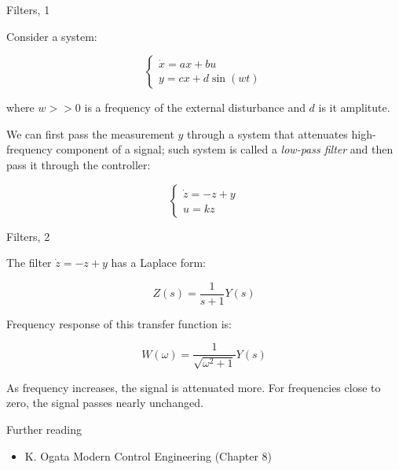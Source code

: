 \documentclass{beamer}
\begin{document}
\begin{frame}{Filters, 1}
	\begin{flushleft}
		
		Consider a system:
		
		\begin{equation}
			\begin{cases}
				\dot{ x }  = 
				ax+bu
				\\
				y = c x + d \sin(wt)
			\end{cases}
		\end{equation}
		
		where $w >>0$ is a frequency of the external disturbance and $d$ is it amplitute.
		
		\bigskip
		
		We can first pass the measurement $y$ through a system that attenuates high-frequency component of a signal; such system is called a \emph{low-pass filter} and then pass it through the controller:
		
		\begin{equation}
			\begin{cases}
				\dot{ z }  = 
				-z+y
				\\
				u = k z
			\end{cases}
		\end{equation}
		 
		
	\end{flushleft}
\end{frame}




\begin{frame}{Filters, 2}
	\begin{flushleft}
		
		The filter $\dot{ z }  = 
		-z+y$ has a Laplace form:
		
		\begin{equation}
			Z(s) = \frac{1}{s+1} Y(s)
		\end{equation}
		
		Frequency response of this transfer function is:
		
		\begin{equation}
			W(\omega) = \frac{1}{\sqrt{\omega^2 + 1}} Y(s)
		\end{equation}
		
		As frequency increases, the signal is attenuated more. For frequencies close to zero, the signal passes nearly unchanged.
		
	\end{flushleft}
\end{frame}




\begin{frame}{Further reading}
	
	\begin{itemize}
		
		\item K. Ogata Modern Control Engineering (Chapter 8)
		
	\end{itemize}
	
\end{frame}

\myqrframe
\end{document}
